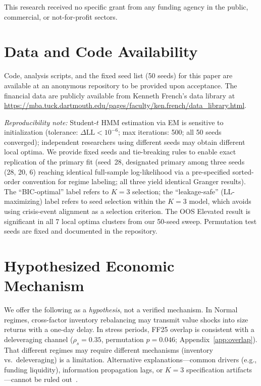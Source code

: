 \documentclass[sigconf,anonymous]{acmart}
\begin{document}
This research received no specific grant from any funding agency in the public,
commercial, or not-for-profit sectors.

\section*{Data and Code Availability}

Code, analysis scripts, and the fixed seed list (50 seeds) for this paper are
available at an anonymous repository to be provided upon acceptance. The
financial data are publicly available from Kenneth French's data library at
\url{https://mba.tuck.dartmouth.edu/pages/faculty/ken.french/data_library.html}.

\emph{Reproducibility note:} Student-$t$ HMM estimation via EM is sensitive
to initialization (tolerance: $\Delta\text{LL} < 10^{-6}$; max iterations: 500;
all 50 seeds converged); independent researchers using different seeds may
obtain different local optima. We provide fixed seeds and tie-breaking rules
to enable exact replication of the primary fit (seed~28, designated
primary among three seeds (28, 20, 6) reaching identical full-sample
log-likelihood via a pre-specified sorted-order convention for regime
labeling; all three yield identical Granger results).
The ``BIC-optimal'' label refers to $K = 3$ selection; the ``leakage-safe''
(LL-maximizing) label refers to seed selection within the $K = 3$ model,
which avoids using crisis-event alignment as a selection criterion.
The OOS Elevated result is significant in all 7 local optima clusters from
our 50-seed sweep. Permutation test seeds are fixed and documented in the
repository.

\appendix

\section{Hypothesized Economic Mechanism}
\label{app:mechanism}

We offer the following as a \emph{hypothesis}, not a verified mechanism.
In Normal regimes, cross-factor inventory rebalancing may transmit value
shocks into size returns with a one-day delay. In stress periods, FF25
overlap is consistent with a deleveraging channel ($\rho_s = 0.35$,
permutation $p = 0.046$; Appendix~\ref{app:overlap}). That different
regimes may require different mechanisms (inventory vs.\ deleveraging)
is a limitation. Alternative explanations---common drivers (e.g., funding
liquidity), information propagation lags, or $K = 3$ specification
artifacts---cannot be ruled out~\cite{greenwood2011stock}.
\end{document}
